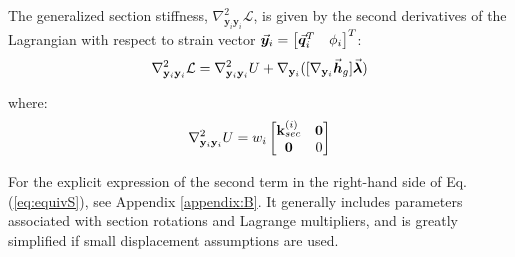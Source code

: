 The generalized section stiffness,
$\nabla^2_{\mathbf{y}_i\mathbf{y}_i}\mathcal{L}$, is given by the second
derivatives of the Lagrangian with respect to strain vector
$\vec{\boldsymbol{y}}_i=\begin{bmatrix}
	\vec{\boldsymbol{q}}_i^T & \phi_i
\end{bmatrix}^T$:  %
\begin{gather}
	\nabla^2_{\mathbf{y}_i\mathbf{y}_i}\mathcal{L} =
	\nabla^2_{\mathbf{y}_i\mathbf{y}_i}U
	+ \nabla_{\mathbf{y}_i}([\nabla_{\mathbf{y}_i}\vec{\boldsymbol{h}}_g]\vec{\boldsymbol{\lambda}})
	\label{eq:equivS}
\end{gather}

\noindent where:
\begin{gather}
	\nabla^2_{\mathbf{y}_i\mathbf{y}_i}U = w_i\begin{bmatrix}
		\mathbf{k}_{sec}^{(i)} & \mathbf{0}\\
		\mathbf{0} & 0
	\end{bmatrix}\nonumber
\end{gather}

\noindent For the explicit expression of the second term in the right-hand side
of Eq. (\ref{eq:equivS}), see Appendix \ref{appendix:B}. It
generally includes parameters associated with section rotations and Lagrange
multipliers, and is greatly simplified if small displacement assumptions
are used.

